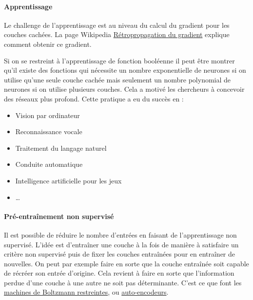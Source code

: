
\paragraph{Apprentissage}
Le challenge de l'apprentissage est au niveau du calcul du gradient pour les couches cachées. La page Wikipedia  \href{https://fr.wikipedia.org/wiki/R\%C3\%A9tropropagation_du_gradient}{Rétropropagation du gradient} explique comment obtenir ce gradient.


Si on se restreint à l'apprentissage de fonction booléenne il peut être montrer qu'il existe des fonctions qui nécessite un nombre exponentielle de neurones si on utilise qu'une seule couche cachée mais seulement un nombre polynomial de neurones si on utilise plusieurs couches. Cela a motivé les chercheurs à concevoir des réseaux plus profond. Cette pratique a eu du succès en :
\begin{itemize}
	\item Vision par ordinateur
	\item Reconnaissance vocale
	\item Traitement du langage naturel
	\item Conduite automatique
	\item Intelligence artificielle pour les jeux
	\item \dots
\end{itemize}

\paragraph{Pré-entraînement non supervisé}
Il est possible de réduire le nombre d'entrées en faisant de l'apprentissage non supervisé. L'idée est d'entraîner une couche à la fois de manière à satisfaire un critère non supervisé puis de fixer les couches entraînées pour en entraîner de nouvelles. On peut par exemple faire en sorte que la couche entraînée soit capable de récréer son entrée d'origine. Cela revient à faire en sorte que l'information perdue d'une couche à une autre ne soit pas déterminante. C'est ce que font les \href{https://fr.wikipedia.org/wiki/Machine_de_Boltzmann_restreinte}{machines de Boltzmann restreintes}, ou \href{https://fr.wikipedia.org/wiki/Auto-encodeur}{auto-encodeurs}.

